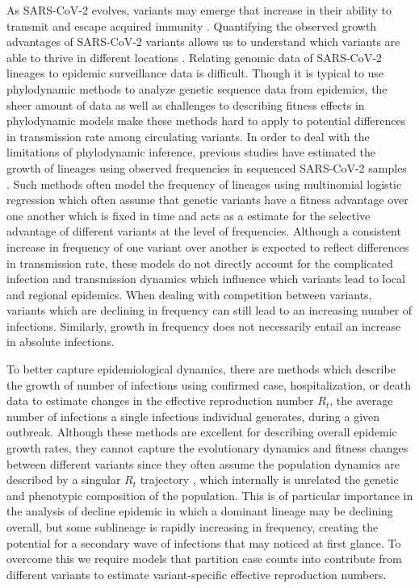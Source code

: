 \documentclass[11pt,oneside,letterpaper]{article}
\begin{document}
As SARS-CoV-2 evolves, variants may emerge that increase in their ability to transmit and escape acquired immunity \cite{tao2021biological}.
Quantifying the observed growth advantages of SARS-CoV-2 variants allows us to understand which variants are able to thrive in different locations \cite{tegally2021detection, davies2021estimated}.
Relating genomic data of SARS-CoV-2 lineages to epidemic surveillance data is difficult.
Though it is typical to use phylodynamic methods to analyze genetic sequence data from epidemics, the sheer amount of data as well as challenges to describing fitness effects in phylodynamic models make these methods hard to apply to potential differences in transmission rate among circulating variants.
In order to deal with the limitations of phylodynamic inference, previous studies have estimated the growth of lineages using observed frequencies in sequenced SARS-CoV-2 samples \cite{Annavajhala2021, Faria2021, Obermeyer2021, Ito2021}.
Such methods often model the frequency of lineages using multinomial logistic regression \cite{Ito2021, Obermeyer2021} which often assume that genetic variants have a fitness advantage over one another which is fixed in time and acts as a estimate for the selective advantage of different variants at the level of frequencies.
Although a consistent increase in frequency of one variant over another is expected to reflect differences in transmission rate, these models do not directly account for the complicated infection and transmission dynamics which influence which variants lead to local and regional epidemics.
When dealing with competition between variants, variants which are declining in frequency can still lead to an increasing number of infections.
Similarly, growth in frequency does not necessarily entail an increase in absolute infections.

To better capture epidemiological dynamics, there are methods which describe the growth of number of infections using confirmed case, hospitalization, or death data to estimate changes in the effective reproduction number $R_{t}$, the average number of infections a single infectious individual generates, during a given outbreak.
Although these methods are excellent for describing overall epidemic growth rates, they cannot capture the evolutionary dynamics and fitness changes between different variants since they often assume the population dynamics are described by a singular $R_{t}$ trajectory \cite{Cori2013, Abbott2020}, which internally is unrelated the genetic and phenotypic composition of the population. %
This is of particular importance in the analysis of decline epidemic in which a dominant lineage may be declining overall, but some sublineage is rapidly increasing in frequency, creating the potential for a secondary wave of infections that may noticed at first glance.
To overcome this we require models that partition case counts into contribute from different variants to estimate variant-specific effective reproduction numbers.
\end{document}
